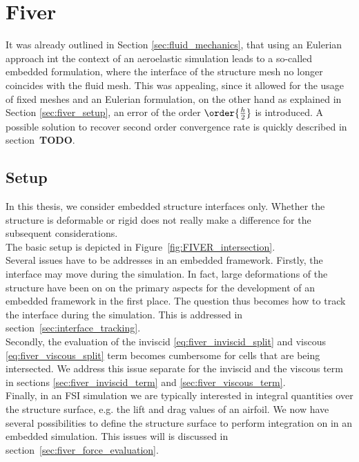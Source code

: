 \documentclass[../main.tex]{subfiles}
\begin{document}
\setlength{\delimitershortfall}{0pt}
\section{Fiver}\label{sec:fiver}

It was already outlined in Section \ref{sec:fluid_mechanics}, that using an Eulerian approach int the context of an aeroelastic simulation leads to a so-called embedded formulation, where the interface of the structure mesh no longer coincides with the fluid mesh. This was appealing, since it allowed for the usage of fixed meshes and an Eulerian formulation, on the other hand as  explained in Section \ref{sec:fiver_setup}, an error of the order $\order{\frac{h}{2}}$ is introduced. A possible solution to recover second order convergence rate is quickly described in section~\textbf{TODO}.


\subsection{Setup}
In this thesis, we consider embedded structure interfaces only. Whether the structure is deformable or rigid does not really make a difference for the subsequent considerations.\\
The basic setup is depicted in Figure~\ref{fig:FIVER_intersection}.\\
Several issues have to be addresses in an embedded framework. Firstly, the interface may move during the simulation. In fact, large deformations of the structure have been on on the primary aspects for the development of an embedded framework in the first place. The question thus becomes how to track the interface during the simulation. This is addressed in section~\ref{sec:interface_tracking}.\\
Secondly, the evaluation of the inviscid \eqref{eq:fiver_inviscid_split} and viscous \eqref{eq:fiver_viscous_split} term becomes cumbersome for cells that are being intersected. We address this issue separate for the inviscid and the viscous term in sections \ref{sec:fiver_inviscid_term} and \ref{sec:fiver_viscous_term}.\\
Finally, in an \ac{FSI} simulation we are typically interested in integral quantities over the structure surface, e.g. the lift and drag values of an airfoil. We now have several possibilities to define the structure surface to perform integration on in an embedded simulation. This issues will is discussed in section~\ref{sec:fiver_force_evaluation}.
\end{document}
